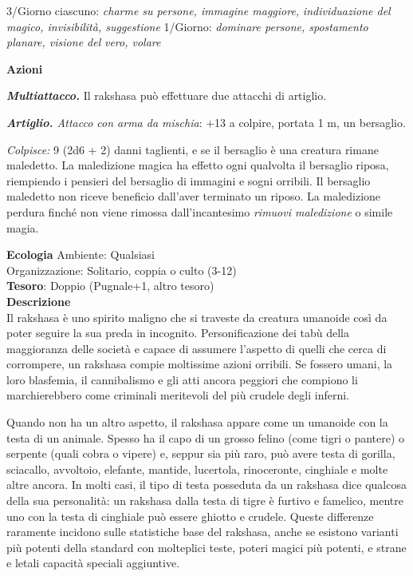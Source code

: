 \begin{multicols}{2}
3/Giorno ciascuno: \textit{charme su persone, immagine maggiore,} \textit{individuazione del magico, invisibilità, suggestione} 1/Giorno: \textit{dominare persone, spostamento planare, visione del} \textit{vero, volare}

\textbf{Azioni}

\textit{\textbf{Multiattacco.}} Il rakshasa può effettuare due attacchi di artiglio.

\textit{\textbf{Artiglio.} Attacco con arma da mischia}: +13 a colpire, portata 1 m, un bersaglio.

\textit{Colpisce:} 9 (2d6 + 2) danni taglienti, e se il bersaglio è una creatura rimane maledetto. La maledizione magica ha effetto ogni qualvolta il bersaglio riposa, riempiendo i pensieri del bersaglio di immagini e sogni orribili. Il bersaglio maledetto non riceve beneficio dall'aver terminato un riposo. La maledizione perdura finché non viene rimossa dall'incantesimo \textit{rimuovi maledizione} o simile magia.

\textbf{Ecologia}
Ambiente: Qualsiasi\\
Organizzazione: Solitario, coppia o culto (3-12)\\
\textbf{Tesoro}: Doppio (Pugnale+1, altro tesoro)\\
\textbf{Descrizione}\\
Il rakshasa è uno spirito maligno che si traveste da creatura umanoide così da poter seguire la sua preda in incognito. Personificazione dei tabù della maggioranza delle società e capace di assumere l'aspetto di quelli che cerca di corrompere, un rakshasa compie moltissime azioni orribili. Se fossero umani, la loro blasfemia, il cannibalismo e gli atti ancora peggiori che compiono li marchierebbero come criminali meritevoli del più crudele degli inferni.

Quando non ha un altro aspetto, il rakshasa appare come un umanoide con la testa di un animale. Spesso ha il capo di un grosso felino (come tigri o pantere) o serpente (quali cobra o vipere) e, seppur sia più raro, può avere testa di gorilla, sciacallo, avvoltoio, elefante, mantide, lucertola, rinoceronte, cinghiale e molte altre ancora. In molti casi, il tipo di testa posseduta da un rakshasa dice qualcosa della sua personalità: un rakshasa dalla testa di tigre è furtivo e famelico, mentre uno con la testa di cinghiale può essere ghiotto e crudele. Queste differenze raramente incidono sulle statistiche base del rakshasa, anche se esistono varianti più potenti della standard con molteplici teste, poteri magici più potenti, e strane e letali capacità speciali aggiuntive.


\end{multicols}
